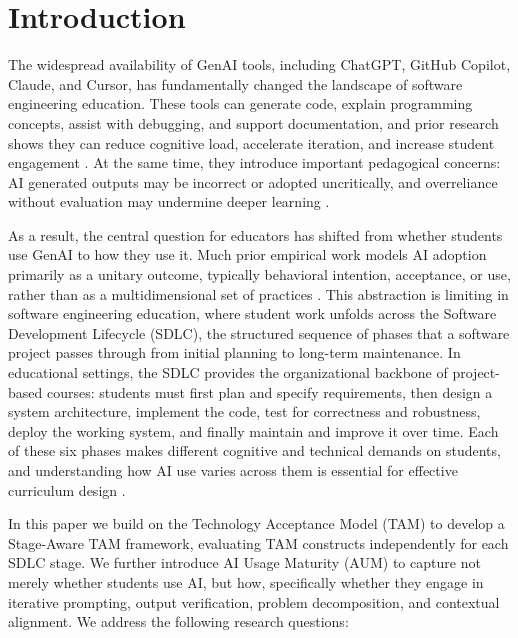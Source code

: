 \documentclass[sigconf,anonymous]{acmart}
\begin{document}
\maketitle

\section{Introduction}

The widespread availability of GenAI tools, including ChatGPT,
GitHub Copilot, Claude, and Cursor, has fundamentally changed
the landscape of software engineering education. These tools can
generate code, explain programming concepts, assist with debugging,
and support documentation, and prior research shows they can reduce
cognitive load, accelerate iteration, and increase student engagement
\cite{ali2025, becker2023, kazemitabaar2023}. At the same time,
they introduce important pedagogical concerns: AI generated outputs
may be incorrect or adopted uncritically, and overreliance without
evaluation may undermine deeper learning \cite{pirzado2024, sakib2023}.

As a result, the central question for educators has shifted from
whether students use GenAI to how they use it. Much prior empirical
work models AI adoption primarily as a unitary outcome, typically
behavioral intention, acceptance, or use, rather than as a
multidimensional set of practices \cite{taheri2025, acosta2024,
alharbi2025}. This abstraction is limiting in software engineering
education, where student work unfolds across the Software Development
Lifecycle (SDLC), the structured sequence of phases that a software
project passes through from initial planning to long-term maintenance.
In educational settings, the SDLC provides the organizational backbone
of project-based courses: students must first plan and specify
requirements, then design a system architecture, implement the code,
test for correctness and robustness, deploy the working system, and
finally maintain and improve it over time. Each of these six phases
makes different cognitive and technical demands on students, and
understanding how AI use varies across them is essential for effective
curriculum design \cite{russo2024}.

In this paper we build on the Technology Acceptance Model
(TAM) \cite{davis1989a, davis1989b} to develop a Stage-Aware TAM
framework, evaluating TAM constructs independently for each SDLC
stage. We further introduce AI Usage Maturity (AUM) to capture
not merely whether students use AI, but how, specifically whether
they engage in iterative prompting, output verification, problem
decomposition, and contextual alignment. We address the following
research questions:
\end{document}
